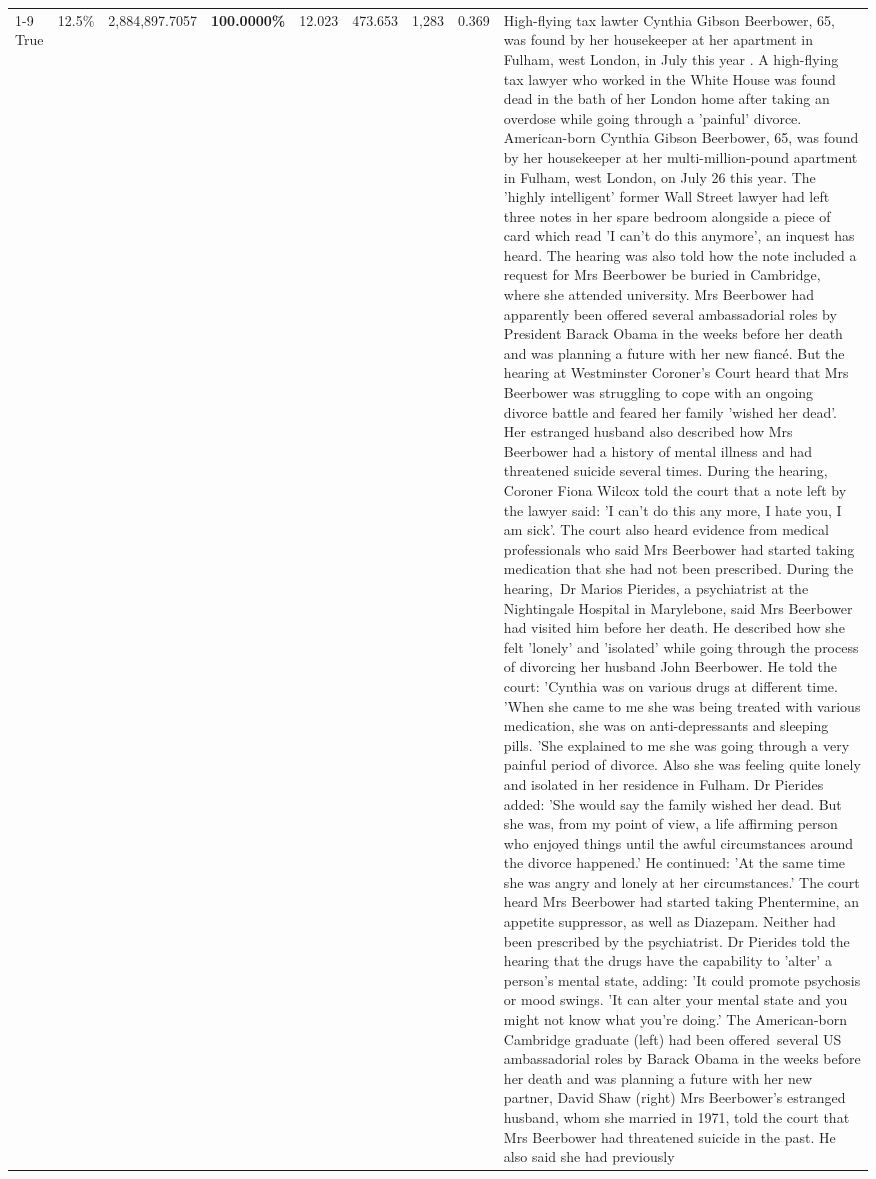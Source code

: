 \begin{table}[H]
\begin{tabular}{lllrlllll}
\cline{1-9}
True & 12.5\% & 2,884,897.7057 & \bfseries \color{red} 100.0000\% & 12.023 & 473.653 & 1,283 & 0.369 & High-flying tax lawter Cynthia Gibson Beerbower, 65, was found by her housekeeper at her apartment in Fulham, west London, in July this year . A high-flying tax lawyer who worked in the White House was found dead in the bath of her London home after taking an overdose while going through a 'painful' divorce. American-born Cynthia Gibson Beerbower, 65, was found by her housekeeper at her multi-million-pound apartment in Fulham, west London, on July 26 this year. The 'highly intelligent' former Wall Street lawyer had left three notes in her spare bedroom alongside a piece of card which read 'I can't do this anymore', an inquest has heard. The hearing was also told how the note included a request for Mrs Beerbower be buried in Cambridge, where she attended university. Mrs Beerbower had apparently been offered several ambassadorial roles by President Barack Obama in the weeks before her death and was planning a future with her new fiancé. But the hearing at Westminster Coroner's Court heard that Mrs Beerbower was struggling to cope with an ongoing divorce battle and feared her family 'wished her dead'. Her estranged husband also described how Mrs Beerbower had a history of mental illness and had threatened suicide several times. During the hearing, Coroner Fiona Wilcox told the court that a note left by the lawyer said: 'I can't do this any more, I hate you, I am sick'. The court also heard evidence from medical professionals who said Mrs Beerbower had started taking medication that she had not been prescribed. During the hearing, Dr Marios Pierides, a psychiatrist at the Nightingale Hospital in Marylebone, said Mrs Beerbower had visited him before her death. He described how she felt 'lonely' and 'isolated' while going through the process of divorcing her husband John Beerbower. He told the court: 'Cynthia was on various drugs at different time. 'When she came to me she was being treated with various medication, she was on anti-depressants and sleeping pills. 'She explained to me she was going through a very painful period of divorce. Also she was feeling quite lonely and isolated in her residence in Fulham. Dr Pierides added: 'She would say the family wished her dead. But she was, from my point of view, a life affirming person who enjoyed things until the awful circumstances around the divorce happened.' He continued: 'At the same time she was angry and lonely at her circumstances.' The court heard Mrs Beerbower had started taking Phentermine, an appetite suppressor, as well as Diazepam. Neither had been prescribed by the psychiatrist. Dr Pierides told the hearing that the drugs have the capability to 'alter' a person's mental state, adding: 'It could promote psychosis or mood swings. 'It can alter your mental state and you might not know what you're doing.' The American-born Cambridge graduate (left) had been offered several US ambassadorial roles by Barack Obama in the weeks before her death and was planning a future with her new partner, David Shaw (right) Mrs Beerbower's estranged husband, whom she married in 1971, told the court that Mrs Beerbower had threatened suicide in the past. He also said she had previously 
\end{tabular}
\end{table}
